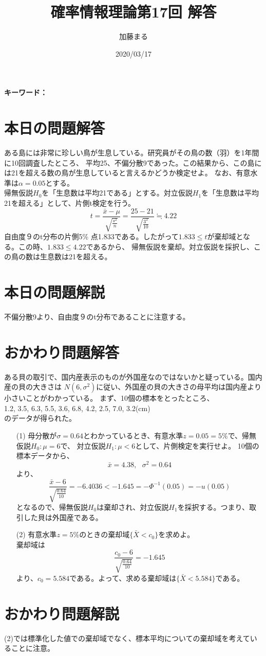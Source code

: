 \documentclass[a4j,uplatex,dvipdfmx]{jsarticle}
\title{確率情報理論第17回 解答}
\author{加藤まる}
\date{2020/03/17}
\begin{document}
\maketitle
\bf キーワード：
\rm

\section*{本日の問題解答}
ある島には非常に珍しい鳥が生息している。研究員がその鳥の数（羽）を1年間に10回調査したところ、
平均25、不偏分散9であった。この結果から、この島には21を超える数の鳥が生息していると言えるかどうか検定せよ。
なお、有意水準は$α=0.05$とする。
\\
帰無仮説$H_0$を「生息数は平均21である」とする。対立仮説$H_1$を「生息数は平均21を超える」として、片側t検定を行う。
\begin{equation}
  t=\frac{\bar{x}-\mu}{\sqrt{\frac{s^2}{n}}}=\frac{25-21}{\sqrt{\frac{3^2}{10}}} \fallingdotseq 4.22
\end{equation}
自由度９のt分布の片側5\% 点1.833である。したがって$1.833\le t$が棄却域となる。この時、$1.833\le 4.22$であるから、
帰無仮説を棄却。対立仮説を採択し、この鳥の数は生息数は21を超える。

\section*{本日の問題解説}
不偏分散9より、自由度９のt分布であることに注意する。

\section*{おかわり問題解答}
ある貝の取引で、国内産表示のものが外国産なのではないかと疑っている。国内産の貝の大きさは
$N(6,\sigma ^2)$に従い、外国産の貝の大きさの母平均は国内産より小さいことがわかっている。
まず、10個の標本をとったところ、\\
1.2, 3.5, 6.3, 5.5, 3.6, 6.8, 4.2, 2.5, 7.0, 3.2(cm)\\
のデータが得られた。
\begin{itemize}
  \item[(1)]母分散が$\sigma=0.64$とわかっているとき、有意水準$z=0.05=5\%$で、帰無仮説$H_0 : \mu=6$で、
  対立仮説$H_1 : \mu <6$として、片側検定を実行せよ。
  10個の標本データから、
  \begin{equation}
    \bar{x}=4.38,~~~\sigma^2=0.64
  \end{equation}
  より、
  \begin{equation}
    \frac{\bar{x}-6}{\sqrt{\frac{0.64}{10}}}=-6.4036<-1.645=-\Phi ^{-1}(0.05)=-u(0.05)
  \end{equation}
  となるので、帰無仮説$H_0$は棄却され、対立仮説$H_1$を採択する。つまり、取引した貝は外国産である。

  \item[(2)]有意水準$z=5\%$のときの棄却域$\{\bar {X}<c_0 \}$を求めよ。\\
  棄却域は
  \begin{equation}
    \frac{c_0-6}{\sqrt{\frac{0.64}{10}}}=-1.645
  \end{equation} 
  より、$c_0=5.584$である。よって、求める棄却域は$\{ \bar{X}<5.584 \}$である。
\end{itemize}

\section*{おかわり問題解説}
(2)では標準化した値での棄却域でなく、標本平均についての棄却域を考えていることに注意。
\end{document}

